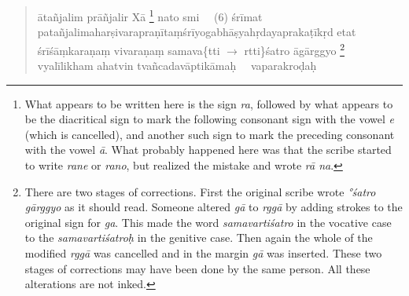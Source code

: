 \begin{quote}
	āta\-ñja\-li\-m prā\-ñja\-lir \ccs X\cce ā%
	\footnote{What appears to be written here is the sign \emph{ra}, followed by what appears to be the diacritical sign to mark the following consonant sign with the vowel \emph{e} (which is cancelled), and another such sign to mark the preceding consonant with the vowel \emph{ā}. What probably happened here was that the scribe started to write \emph{rane} or \emph{rano}, but realized the mistake and wrote \emph{rā na}.}%
	na\-to smi \HTG\ \HTG\ 
	(6) śrīmat pa\-ta\-ñja\-li\-ma\-ha\-rṣi\-vara\-pra\-ṇī\-ta\-\ccs ṃ\cce śrī\-yoga\-bhā\-ṣya\-hṛ\-da\-ya\-pra\-ka\-ṭī\-kṛd etat śrī\-śāṃ\-ka\-ra\ccs ṇa\cce\-ṃ vi\-va\-ra\-ṇaṃ sa\-ma\-va\{tti $\rightarrow$ rtti\}śa\-tro ā\cce \ins gā\ine rggyo%
	\footnote{\label{GATORGG}There are two stages of corrections. First the original scribe wrote \emph{°śatro gārggyo} as it should read. Someone altered \emph{gā} to \emph{rggā} by adding strokes to the original sign for \emph{ga}. This made the word \emph{samavartiśatro} in the vocative case to the \emph{samavartiśatroḥ} in the genitive case. Then again the whole of the modified \emph{rggā} was cancelled and in the margin \emph{gā} was inserted. These two stages of corrections may have been done by the same person. All these alterations are not inked.} %
	vya\-lī\-li\-kha\-m aha\ccs tvi\cce \ins n tva\ine\ccs ñca\cce da\-vā\-pti\-kā\-maḥ \HTG\ \HTG\ \ccs va\cce\ins pa\ine ra\-kro\-ḍaḥ \HTG\ \HTG\ \HTG
\end{quote}

